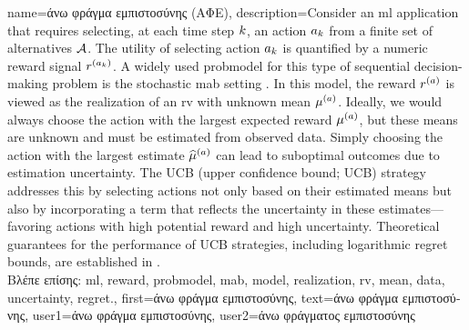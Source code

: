 
{name={\foreignlanguage{greek}{άνω φράγμα εμπιστοσύνης (ΑΦΕ)}},
	description={Consider an \gls{ml} 
		application that requires selecting, at each time step $k$, an action $a_{k}$ 
		from a finite set of alternatives $\mathcal{A}$. The utility of selecting action $a_{k}$ 
		is quantified by a numeric \gls{reward} signal $r^{(a_{k})}$. 
		A widely used \gls{probmodel} for this type of sequential decision-making problem 
		is the stochastic \gls{mab} setting \cite{Bubeck2012}. In this \gls{model}, 
		the \gls{reward} $r^{(a)}$ is viewed as the \gls{realization} of an \gls{rv} 
		with unknown \gls{mean} $\mu^{(a)}$. Ideally, we would always choose the 
		action with the largest expected \gls{reward} $\mu^{(a)}$, but these 
		\gls{mean}s are unknown and must be estimated from observed \gls{data}. Simply 
		choosing the action with the largest estimate $\widehat{\mu}^{(a)}$ can 
		lead to suboptimal outcomes due to estimation \gls{uncertainty}. The UCB (upper confidence bound; UCB) strategy 
		addresses this by selecting actions not only based on their estimated \gls{mean}s but 
		also by incorporating a term that reflects the \gls{uncertainty} in these estimates—favoring 
		actions with high potential \gls{reward} and high \gls{uncertainty}. Theoretical guarantees 
		for the performance of UCB strategies, including logarithmic \gls{regret} bounds, are established in \cite{Bubeck2012}.\\
		\foreignlanguage{greek}{Βλέπε επίσης:} \gls{ml}, \gls{reward}, \gls{probmodel}, \gls{mab}, \gls{model}, \gls{realization}, \gls{rv}, \gls{mean}, \gls{data}, \gls{uncertainty}, \gls{regret}.},
	first={\foreignlanguage{greek}{άνω φράγμα εμπιστοσύνης}},
	text={\foreignlanguage{greek}{άνω φράγμα εμπιστοσύνης}},
	user1={\foreignlanguage{greek}{άνω φράγμα εμπιστοσύνης}}, %
    	user2={\foreignlanguage{greek}{άνω φράγματος εμπιστοσύνης}} %
}

